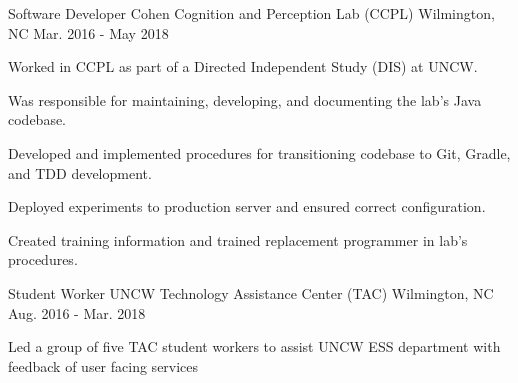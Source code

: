 

\begin{cventries}
  \cventry
    {Software Developer} %
    {Cohen Cognition and Perception Lab (CCPL)} %
    {Wilmington, NC} %
    {Mar. 2016 - May 2018} %
    {
      \begin{cvitems}
        \item {Worked in CCPL as part of a Directed Independent Study (DIS) at UNCW.}
        \item {Was responsible for maintaining, developing, and documenting the lab's Java codebase.}
        \item {Developed and implemented procedures for transitioning codebase to Git, Gradle, and TDD development.}
        \item {Deployed experiments to production server and ensured correct configuration.}
        \item {Created training information and trained replacement programmer in lab's procedures.}
      \end{cvitems}
    }
  \cventry
    {Student Worker}
    {UNCW Technology Assistance Center (TAC)} %
    {Wilmington, NC} %
    {Aug. 2016 - Mar. 2018} %
    {
      \begin{cvsubentries}
        {
          \begin{cvsubitems}
            \item {
                Led a group of five TAC student workers to assist UNCW ESS
                department with feedback of user facing services
              }
          \end{cvsubitems}
        }
        {
          \begin{cvsubitems}

\end{cvsubitems}}
\end{cvsubentries}}
\end{cventries}
